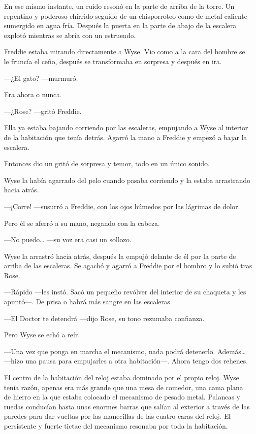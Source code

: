 {En ese mismo instante, un ruido resonó en la parte de arriba de la
	torre. Un repentino y poderoso chirrido seguido de un chisporroteo
	como de metal caliente sumergido en agua fría. Después la puerta en
la parte de abajo de la escalera explotó mientras se abría con un estruendo.}

{Freddie estaba mirando directamente a Wyse. Vio como a la cara del
	hombre se le fruncía el ceño, después se transformaba en sorpresa y
después en ira.}

{---¿El gato? ---murmuró.}

{Era ahora o nunca.}

{---¿Rose? ---gritó Freddie.}

{Ella ya estaba bajando corriendo por las escaleras, empujando a Wyse al
	interior de la habitación que tenía detrás. Agarró la mano a Freddie
y empezó a bajar la escalera.}

{Entonces dio un gritó de sorpresa y temor, todo en un único sonido.}

{Wyse la había agarrado del pelo cuando pasaba corriendo y la estaba
arrastrando hacia atrás.}

{---¡Corre! ---susurró a Freddie, con los ojos húmedos por las lágrimas
de dolor.}

{Pero él se aferró a su mano, negando con la cabeza.}

{---No puedo\ldots{} ---su voz era casi un sollozo.}

{Wyse la arrastró hacia atrás, después la empujó delante de él por la
	parte de arriba de las escaleras. Se agachó y agarró a Freddie por
el hombro y lo subió tras Rose.}

{---Rápido ---les instó. Sacó un pequeño revólver del interior de su
	chaqueta y les apuntó---. De prisa o habrá más sangre en las
escaleras.}

{---El Doctor te detendrá ---dijo Rose, su tono rezumaba confianza.}

{Pero Wyse se echó a reír.}

{---Una vez que ponga en marcha el mecanismo, nada podrá
	detenerlo. Además\ldots{}---hizo una pausa para empujarles a otra
habitación---. Ahora tengo dos rehenes.}

{El centro de la habitación del reloj estaba dominado por el propio
	reloj. Wyse tenía razón, apenas era más grande que una mesa de
	comedor, una cama plana de hierro en la que estaba colocado el mecanismo
	de pesado metal. Palancas y ruedas conducían hasta unas enormes
	barras que salían al exterior a través de las paredes para dar vueltas
	por las manecillas de las cuatro caras del reloj. El persistente y
fuerte tictac del mecanismo resonaba por toda la habitación.}

